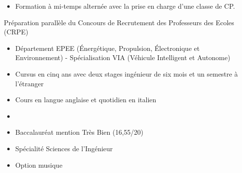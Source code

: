 \documentclass[10pt,a4paper,ragged2e,withhyper,normalphoto]{altacv}
\begin{document}
\begin{paracol}{2}


\begin{itemize}
	\item Formation à mi-temps alternée avec la prise en charge d'une classe de CP.
\end{itemize}

\divider

Préparation parallèle du Concours de Recrutement des Professeurs des Ecoles (CRPE)

\divider

\begin{itemize}
	\item Département EPEE (\'{E}nergétique, Propulsion, \'{E}lectronique et Environnement) - Spécialisation VIA (Véhicule Intelligent et Autonome)
	\item Cursus en cinq ans avec deux stages ingénieur de six mois et un semestre à l'étranger
\end{itemize}

\divider

\begin{itemize}
	\item Cours en langue anglaise et quotidien en italien
	\item
\end{itemize}

\divider

\begin{itemize}
	\item Baccalauréat mention Très Bien (16,55/20)
	\item Spécialité Sciences de l'Ingénieur
	\item Option musique
\end{itemize}


\end{paracol}
\end{document}
